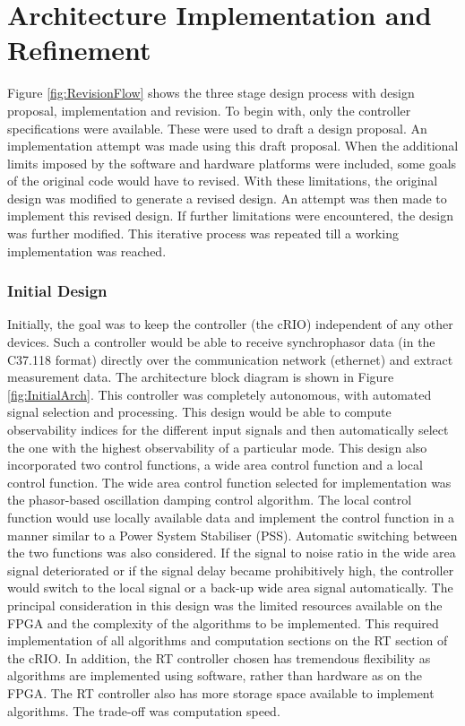 \documentclass[conference]{IEEEtran}
\begin{document}
\section{Architecture Implementation and Refinement}

Figure \ref{fig:RevisionFlow} shows the three stage design process with design proposal, implementation and revision. To begin with, only the controller specifications were available. These were used to draft a design proposal. An implementation attempt was made using this draft proposal. When the additional limits imposed by the software and hardware platforms were included, some goals of the original code would have to revised. With these limitations, the original design was modified to generate a revised design. An attempt was then made to implement this revised design. If further limitations were encountered, the design was further modified. This iterative process was repeated till a working implementation was reached.\\

\subsubsection{Initial Design}

Initially, the goal was to keep the controller (the cRIO) independent of any other devices. Such a controller would be able to receive synchrophasor data (in the C37.118 format) directly over the communication network (ethernet) and extract measurement data. The architecture block diagram is shown in Figure  \ref{fig:InitialArch}. This controller was completely autonomous, with automated signal selection and processing. This design would be able to compute observability indices for the different input signals and then automatically select the one with the highest observability of a particular mode. This design also incorporated two control functions, a wide area control function and a local control function. The wide area control function selected for implementation was the phasor-based oscillation damping control algorithm\cite{PhasorPOD}. The local control function would use locally available data and implement the control function in a manner similar to a Power System Stabiliser (PSS). Automatic switching between the two functions was also considered. If the signal to noise ratio in the wide area signal deteriorated or if the signal delay became prohibitively high, the controller would switch to the local signal or a back-up wide area signal automatically. The principal consideration in this design was the limited resources available on the FPGA and the complexity of the algorithms to be implemented. This required implementation of all algorithms and computation sections on the RT section of the cRIO. In addition, the RT controller chosen has tremendous flexibility as algorithms are implemented using software, rather than hardware as on the FPGA. The RT controller also has more storage space available to implement algorithms. The trade-off was computation speed.\\
\end{document}
